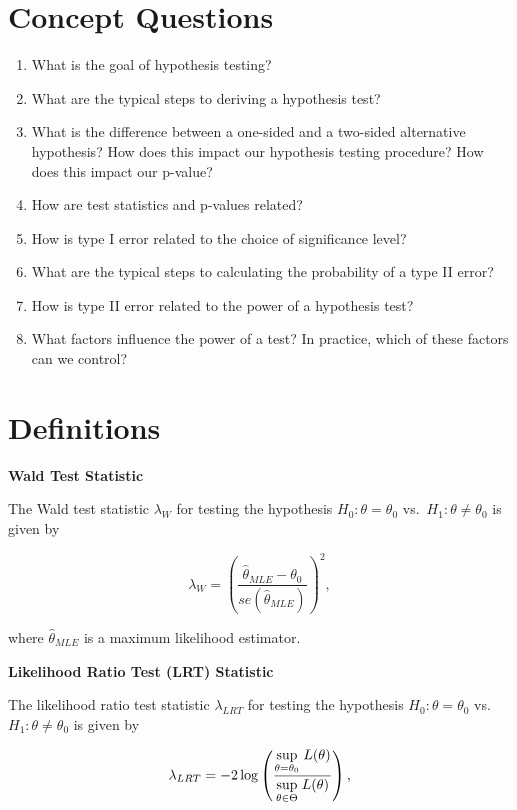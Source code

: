 \documentclass[
  letterpaper,
  DIV=11,
  numbers=noendperiod]{scrreprt}
\providecommand{\tightlist}{%
  \setlength{\itemsep}{0pt}\setlength{\parskip}{0pt}}\usepackage{longtable,booktabs,array}
\begin{document}
\section{Concept Questions}\label{concept-questions-6}

\begin{enumerate}
\def\labelenumi{\arabic{enumi}.}
\tightlist
\item
  What is the goal of hypothesis testing?
\item
  What are the typical steps to deriving a hypothesis test?
\item
  What is the difference between a one-sided and a two-sided alternative
  hypothesis? How does this impact our hypothesis testing procedure? How
  does this impact our p-value?
\item
  How are test statistics and p-values related?
\item
  How is type I error related to the choice of significance level?
\item
  What are the typical steps to calculating the probability of a type II
  error?
\item
  How is type II error related to the power of a hypothesis test?
\item
  What factors influence the power of a test? In practice, which of
  these factors can we control?
\end{enumerate}

\section{Definitions}\label{definitions-6}

\textbf{Wald Test Statistic}

The Wald test statistic \(\lambda_W\) for testing the hypothesis
\(H_0: \theta = \theta_0\) vs.~\(H_1: \theta \neq \theta_0\) is given by

\[
\lambda_W = \left(\frac{\hat{\theta}_{MLE} - \theta_0}{se(\hat{\theta}_{MLE})}\right)^2,
\]

where \(\hat{\theta}_{MLE}\) is a maximum likelihood estimator.

\textbf{Likelihood Ratio Test (LRT) Statistic}

The likelihood ratio test statistic \(\lambda_{LRT}\) for testing the
hypothesis \(H_0: \theta = \theta_0\) vs.~\(H_1: \theta \neq \theta_0\)
is given by

\[
\lambda_{LRT} = -2 \log\left(\frac{\underset{\theta = \theta_0}{\text{sup}} \hspace{1mm} L(\theta)}{\underset{\theta \in \Theta}{\text{sup}} \hspace{1mm} L(\theta)}\right),
\]
\end{document}
